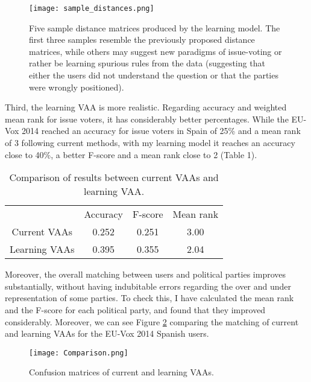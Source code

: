 \documentclass{scrartcl}
\begin{document}
\begin{figure} [h]
    \centering 
    \texttt{[image: sample\_distances.png]}
    \caption{Five sample distance matrices produced by the learning model. The first three samples resemble the previously proposed distance matrices, while others may suggest new paradigms of issue-voting or rather be learning spurious rules from the data (suggesting that either the users did not understand the question or that the parties were wrongly positioned).}
    \label{fig:sample}
\end{figure}


Third, the learning VAA is more realistic. Regarding accuracy and weighted mean rank for issue voters, it has considerably better percentages. While the EU-Vox 2014 reached an accuracy for issue voters in Spain of 25\% and a mean rank of 3 following current methods, with my learning model it reaches an accuracy close to 40\%, a better F-score and a mean rank close to 2 (Table 1).
\\

\begin{table}[h]
    \centering
    \begin{tabular}{cccc}
    \hline
        	         & Accuracy & F-score   & Mean rank \\ 
        Current VAAs & 0.252    & 0.251     & 3.00 \\ 
        Learning VAAs	 & 0.395    & 0.355     & 2.04
    \end{tabular}
    \caption{Comparison of results between current VAAs and learning VAA.}
    \label{tab:results}
\end{table}


Moreover, the overall matching between users and political parties improves substantially, without having indubitable errors regarding the over and under representation of some parties. To check this, I have calculated the mean rank and the F-score for each political party, and found that they improved considerably. Moreover, we can see Figure \ref{fig:comparison} comparing the matching of current and learning VAAs for the EU-Vox 2014 Spanish users. 

\begin{figure}[h]
    \centering 
    \texttt{[image: Comparison.png]}
    \caption{Confusion matrices of current and learning VAAs.}
    \label{fig:comparison}
\end{figure}
\end{document}
